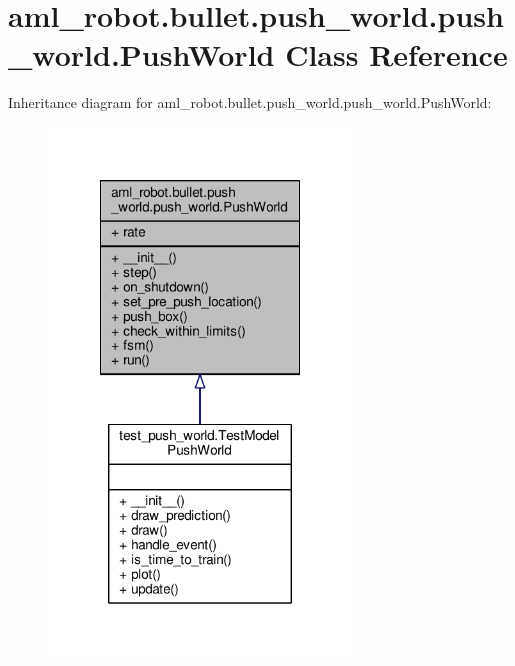\hypertarget{classaml__robot_1_1bullet_1_1push__world_1_1push__world_1_1_push_world}{\section{aml\-\_\-robot.\-bullet.\-push\-\_\-world.\-push\-\_\-world.\-Push\-World Class Reference}
\label{classaml__robot_1_1bullet_1_1push__world_1_1push__world_1_1_push_world}
}


Inheritance diagram for aml\-\_\-robot.\-bullet.\-push\-\_\-world.\-push\-\_\-world.\-Push\-World\-:
\nopagebreak
\begin{figure}[H]
\begin{center}
\leavevmode
\includegraphics[width=228pt]{classaml__robot_1_1bullet_1_1push__world_1_1push__world_1_1_push_world__inherit__graph}
\end{center}
\end{figure}



